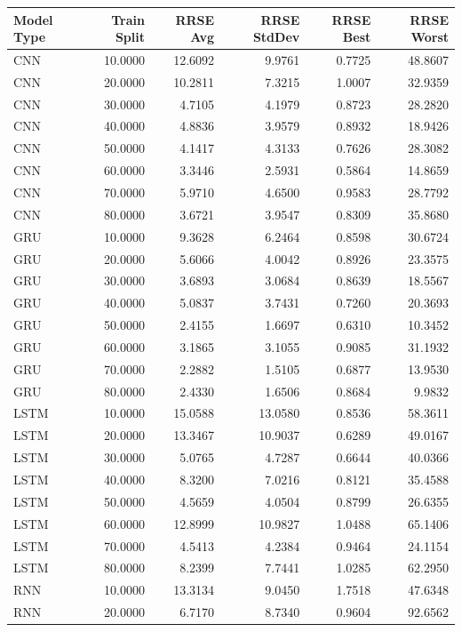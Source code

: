 \begin{tabular}{lrrrrr}
\toprule
Model Type & Train Split & RRSE Avg & RRSE StdDev & RRSE Best & RRSE Worst \\
\midrule
CNN & 10.0000 & 12.6092 & 9.9761 & 0.7725 & 48.8607 \\
CNN & 20.0000 & 10.2811 & 7.3215 & 1.0007 & 32.9359 \\
CNN & 30.0000 & 4.7105 & 4.1979 & 0.8723 & 28.2820 \\
CNN & 40.0000 & 4.8836 & 3.9579 & 0.8932 & 18.9426 \\
CNN & 50.0000 & 4.1417 & 4.3133 & 0.7626 & 28.3082 \\
CNN & 60.0000 & 3.3446 & 2.5931 & 0.5864 & 14.8659 \\
CNN & 70.0000 & 5.9710 & 4.6500 & 0.9583 & 28.7792 \\
CNN & 80.0000 & 3.6721 & 3.9547 & 0.8309 & 35.8680 \\
GRU & 10.0000 & 9.3628 & 6.2464 & 0.8598 & 30.6724 \\
GRU & 20.0000 & 5.6066 & 4.0042 & 0.8926 & 23.3575 \\
GRU & 30.0000 & 3.6893 & 3.0684 & 0.8639 & 18.5567 \\
GRU & 40.0000 & 5.0837 & 3.7431 & 0.7260 & 20.3693 \\
GRU & 50.0000 & 2.4155 & 1.6697 & 0.6310 & 10.3452 \\
GRU & 60.0000 & 3.1865 & 3.1055 & 0.9085 & 31.1932 \\
GRU & 70.0000 & 2.2882 & 1.5105 & 0.6877 & 13.9530 \\
GRU & 80.0000 & 2.4330 & 1.6506 & 0.8684 & 9.9832 \\
LSTM & 10.0000 & 15.0588 & 13.0580 & 0.8536 & 58.3611 \\
LSTM & 20.0000 & 13.3467 & 10.9037 & 0.6289 & 49.0167 \\
LSTM & 30.0000 & 5.0765 & 4.7287 & 0.6644 & 40.0366 \\
LSTM & 40.0000 & 8.3200 & 7.0216 & 0.8121 & 35.4588 \\
LSTM & 50.0000 & 4.5659 & 4.0504 & 0.8799 & 26.6355 \\
LSTM & 60.0000 & 12.8999 & 10.9827 & 1.0488 & 65.1406 \\
LSTM & 70.0000 & 4.5413 & 4.2384 & 0.9464 & 24.1154 \\
LSTM & 80.0000 & 8.2399 & 7.7441 & 1.0285 & 62.2950 \\
RNN & 10.0000 & 13.3134 & 9.0450 & 1.7518 & 47.6348 \\
RNN & 20.0000 & 6.7170 & 8.7340 & 0.9604 & 92.6562 \\

\end{tabular}
